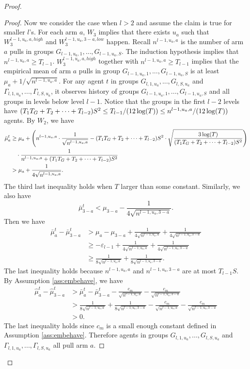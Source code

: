 \begin{proof}
\begin{proof}
Now we consider the case when $l > 2$ and assume the claim is true for smaller $l$'s. For each arm $a$, $W_3$ implies that there exists $u_a$ such that $W^{l-1,u_a,a,high}_3$ and $W^{l-1,u_a,3-a,low}_3$ happen. Recall $n^{l-1,u_a,a}$ is the number of arm $a$ pulls in groups $G_{l-1,u_a,1},...,G_{l-1,u_a,S}$. The induction hypothesis implies that $n^{l-1,u_a,a} \geq T_{l-1}$. $W^{l-1,u_a,a,high}_3$ together with $n^{l-1,u_a,a} \geq T_{l-1}$ implies that the empirical mean of arm $a$ pulls in group $G_{l-1,u_a,1},...,G_{l-1,u_a,S}$ is at least $\mu_a + 1/\sqrt{n^{l-1,u_a,a}}$. For any agent $t$ in groups $G_{l,1,u_a},...,G_{l,S,u_a}$ and $\Gamma_{l,1,u_a},...,\Gamma_{l,S,u_a}$, it observes history of groups $G_{l-1,u_a,1},...,G_{l-1,u_a,S}$ and all groups in levels below level $l-1$. Notice that the groups in the first $l-2$ levels have $(T_1 T_G + T_2 + \cdots +T_{l-2})S^2 \leq T_{l-1}/(12\log(T)) \leq n^{l-1,u_a,a}/(12\log(T))$ agents. By $W_2$, we have
\begin{align*}
\bar{\mu}_a ^t &\geq \mu_a + \left(n^{l-1,u_a,a}  \cdot \frac{1}{\sqrt{n^{l-1,u_a,a} }}- (T_1 T_G + T_2 + \cdots +T_{l-2})S^2\cdot \sqrt{\frac{3\log(T)}{ (T_1 T_G + T_2 + \cdots +T_{l-2})S^2}} \right) \\
&~~~\cdot \frac{1}{n^{l-1,u_a,a}+ (T_1 T_G + T_2 + \cdots +T_{l-2})S^2} \\
&> \mu_a + \frac{1}{4\sqrt{n^{l-1,u_a,a}  }}.
\end{align*}
The third last inequality holds when $T$ larger than some constant.
Similarly, we also have
\[
\bar{\mu}_{3-a}^t < \mu_{3-a}   -\frac{1}{4\sqrt{n^{l-1,u_a,3-a}  }}.
\]
Then we have
\begin{align*}
\bar{\mu}^t_a - \bar{\mu}^t_{3-a} &> \mu_a - \mu_{3-a}+ \frac{1}{4\sqrt{n^{l-1,u_a,a}  }} +\frac{1}{4\sqrt{n^{l-1,u_a,3-a}  }}\\
&\geq -\varepsilon_{l-1}+ \frac{1}{4\sqrt{n^{l-1,u_a,a}  }} +\frac{1}{4\sqrt{n^{l-1,u_a,3-a}  }}\\
&\geq \frac{1}{8\sqrt{n^{l-1,u_a,a}  }} +\frac{1}{8\sqrt{n^{l-1,u_a,3-a}  }}.
\end{align*}
The last inequality holds because $n^{l-1,u_a,a}$ and $n^{l-1,u_a,3-a}$ are at most $T_{l-1} S$. By Assumption \ref{ass:embehave}, we have
\begin{align*}
\hat{\mu}_a^t - \hat{\mu}_{3-a}^t &> \bar{\mu}^t_a - \bar{\mu}^t_{3-a} -  \frac{c_m}{\sqrt{n^{l-1,u_a,a} }} - \frac{c_m}{\sqrt{n^{l-1,u_a,3-a}}}\\
&> \frac{1}{8\sqrt{n^{l-1,u_a,a}  }} +\frac{1}{8\sqrt{n^{l-1,u_a,3-a}  }} -  \frac{c_m}{\sqrt{n^{l-1,u_a,a} }} - \frac{c_m}{\sqrt{n^{l-1,u_a,3-a}}}\\
&>0.
\end{align*}
The last inequality holds since $c_m$ is a small enough constant defined in Assumption \ref{ass:embehave}.
Therefore agents in groups $G_{l,1,u_a},...,G_{l,S,u_a}$ and $\Gamma_{l,1,u_a},...,\Gamma_{l,S,u_a}$ all pull arm $a$.
\end{proof}


\end{proof}
